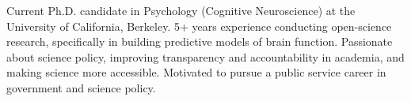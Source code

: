 

\begin{cvparagraph}

Current Ph.D. candidate in Psychology (Cognitive Neuroscience) at the University of California, Berkeley. 5+ years experience conducting open-science research, specifically in building predictive models of brain function. Passionate about science policy, improving transparency and accountability in academia, and making science more accessible. Motivated to pursue a public service career in government and science policy. 

\end{cvparagraph}

